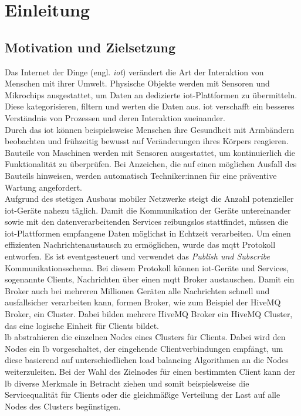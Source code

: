 \section{Einleitung}
\subsection{Motivation und Zielsetzung}
Das Internet der Dinge (engl. \textit{\acf{iot}}) verändert die Art der Interaktion von Menschen mit ihrer Umwelt. Physische Objekte werden mit Sensoren und Mikrochips ausgestattet, um Daten an dedizierte \ac{iot}-Plattformen zu übermitteln. Diese kategorisieren, filtern und werten die Daten aus.
\acs{iot} verschafft ein besseres Verständnis von Prozessen und deren Interaktion zueinander.
\\
Durch das \acl{iot} können beispielsweise Menschen ihre Gesundheit mit Armbändern beobachten und frühzeitig bewusst auf Veränderungen ihres Körpers reagieren. Bauteile von Maschinen werden mit Sensoren ausgestattet, um kontinuierlich die Funktionalität zu überprüfen. Bei Anzeichen, die auf einen möglichen Ausfall des Bauteils hinweisen, werden automatisch Techniker:innen für eine präventive Wartung angefordert.
\\
Aufgrund des stetigen Ausbaus mobiler Netzwerke steigt die Anzahl potenzieller \ac{iot}-Geräte nahezu täglich. Damit die Kommunikation der Geräte untereinander sowie mit den datenverarbeitenden Services reibungslos stattfindet, müssen die \ac{iot}-Plattformen empfangene Daten möglichst in Echtzeit verarbeiten.
Um einen effizienten Nachrichtenaustausch zu ermöglichen, wurde das \ac{mqtt} Protokoll entworfen.
Es ist eventgesteuert und verwendet das \textit{Publish und Subscribe} Kommunikationsschema.
Bei diesem Protokoll können \ac{iot}-Geräte und Services, sogenannte Clients, Nachrichten über einen \ac{mqtt} Broker austauschen.
Damit ein Broker auch bei mehreren Millionen Geräten alle Nachrichten schnell und ausfallsicher verarbeiten kann, formen Broker, wie zum Beispiel der HiveMQ Broker, ein Cluster. Dabei bilden mehrere HiveMQ Broker ein HiveMQ Cluster, das eine logische Einheit für Clients bildet.
\\
\acl{lb} abstrahieren die einzelnen Nodes eines Clusters für Clients.
Dabei wird den Nodes ein \acl{lb} vorgeschaltet, der eingehende Clientverbindungen empfängt, um diese basierend auf unterschiedlichen load balancing Algorithmen an die Nodes weiterzuleiten.
Bei der Wahl des Zielnodes für einen bestimmten Client kann der \acl{lb} diverse Merkmale in Betracht ziehen und somit beispielsweise die Servicequalität für Clients oder die gleichmä{\ss}ige Verteilung der Last auf alle Nodes des Clusters begünstigen.
